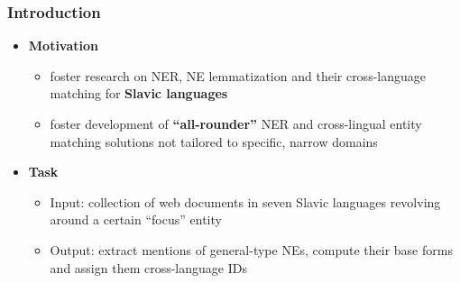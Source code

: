\documentclass{beamer}
\begin{document}
\begin{frame}
 \frametitle{Introduction}

\begin{itemize}

\item \textbf{Motivation} 

\begin{itemize}

\item foster research on NER, NE lemmatization and their cross-language matching for {\color{red}\textbf{Slavic languages}}

\vspace{0.2cm}

\item foster development of \textbf{“all-rounder”} NER and cross-lingual entity matching solutions not tailored 
to specific, narrow domains

\end{itemize}

\item \textbf{Task} 

\begin{itemize}

\item {\color{red}Input:} collection of web documents in seven Slavic languages revolving around a certain “focus” entity

\vspace{0.2cm}

\item {\color{red}Output:} extract mentions of general-type NEs, compute their base forms and assign them cross-language IDs

\end{itemize}

\end{itemize}

\end{frame}
\end{document}
